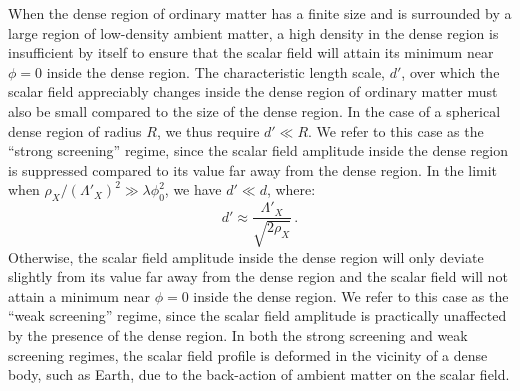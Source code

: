 \documentclass[aps,prd,onecolumn,nofootinbib]{revtex4-2} %
\begin{document}
When the dense region of ordinary matter has a finite size and is surrounded by a large region of low-density ambient matter, a high density in the dense region is insufficient by itself to ensure that the scalar field will attain its minimum near $\phi = 0$ inside the dense region. 
The characteristic length scale, $d'$, over which the scalar field appreciably changes inside the dense region of ordinary matter must also be small compared to the size of the dense region. 
In the case of a spherical dense region of radius $R$, we thus require $d' \ll R$. 
We refer to this case as the ``strong screening'' regime, since the scalar field amplitude inside the dense region is suppressed compared to its value far away from the dense region. 
In the limit when $\rho_X / (\Lambda'_X)^2 \gg \lambda \phi_0^2$, we have $d' \ll d$, where: 
\begin{equation}
\label{wall_thickness-dense_region}
d' \approx \frac{\Lambda'_X}{\sqrt{2 \rho_X}}  \, . 
\end{equation}
Otherwise, the scalar field amplitude inside the dense region will only deviate slightly from its value far away from the dense region and the scalar field will not attain a minimum near $\phi = 0$ inside the dense region. 
We refer to this case as the ``weak screening'' regime, since the scalar field amplitude is practically unaffected by the presence of the dense region. 
In both the strong screening and weak screening regimes, the scalar field profile is deformed in the vicinity of a dense body, such as Earth, due to the back-action of ambient matter on the scalar field. 
\end{document}
